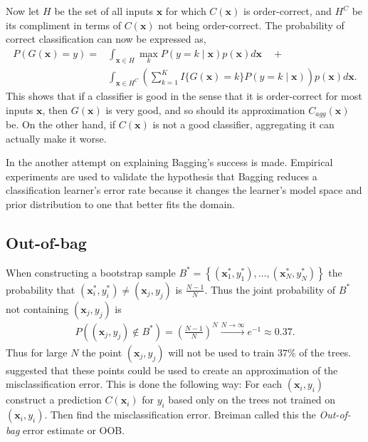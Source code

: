 Now let $H$ be the set of all inputs $\mathbf{x}$ for which $C(\mathbf{x})$ is order-correct, and $H^C$ be its compliment in terms of $C(\mathbf{x})$ not being order-correct. The probability of correct classification can now be expressed as,
\begin{align}
  P(G(\mathbf{x}) = y) = &\int_{\mathbf{x} \in H} \max_k P(y=k \mid \mathbf{x})  p(\mathbf{x}) d\mathbf{x} \quad + \\
  &\int_{\mathbf{x} \in H^C} \left(\sum^{K}_{k=1} I\{ G(\mathbf{x}) = k \} P(y=k \mid \mathbf{x})   \right) p(\mathbf{x}) d\mathbf{x}.
\end{align}
This shows that if a classifier is good in the sense that it is order-correct for most inputs $\mathbf{x}$, then $G(\mathbf{x})$ is very good, and so should its approximation $C_{agg}(\mathbf{x})$ be. On the other hand, if $C(\mathbf{x})$ is not a good classifier, aggregating it can actually make it worse.

In \cite{domingos1997Bagging} the another attempt on explaining Bagging's success is made. Empirical experiments are used to validate the hypothesis that Bagging reduces a classification learner's error rate because it changes the learner's model space and prior distribution to one that better fits the domain. 


\subsection{Out-of-bag}
\label{sub:Out-of-bag}
When constructing a bootstrap sample $B^* = \left\{ (\mathbf{x}_1^*, y_1^*), \ldots, (\mathbf{x}_N^*, y_N^*) \right\}$ the probability that $(\mathbf{x}_i^*, y_i^*) \neq (\mathbf{x}_j, y_j)$ is $\frac{N-1}{N}$. Thus the joint probability of $B^*$ not containing $(\mathbf{x}_j, y_j)$ is 
\begin{align}
  P\left(  (\mathbf{x}_j, y_j) \notin B^*\right) = \left( \frac{N-1}{N}  \right)^N
  \xrightarrow{N \rightarrow \infty} e^{-1} \approx 0.37. 
\end{align}
Thus for large $N$ the point $(\mathbf{x}_j, y_j)$ will not be used to train $37 \%$ of the trees. \cite{outOfBag} suggested that these points could be used to create an approximation of the misclassification error. This is done the following way: For each $(\mathbf{x}_i, y_i)$ construct a prediction $C(\mathbf{x}_i)$ for $y_i$ based only on the trees not trained on $(\mathbf{x}_i, y_i)$. Then find the misclassification error. Breiman called this the \textit{Out-of-bag} error estimate or OOB. 

